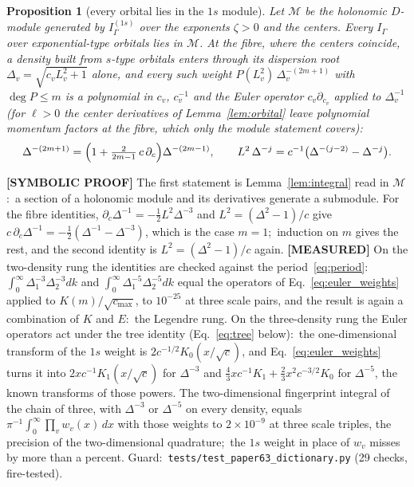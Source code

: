 \documentclass[aps,pra,twocolumn,superscriptaddress,longbibliography]{revtex4-2}
\newtheorem{proposition}{Proposition}
\begin{document}
\begin{proposition}[every orbital lies in the $1s$ module]
\label{prop:rung}
Let $\mathcal{M}$ be the holonomic $D$-module generated by $I^{(1s)}_\Gamma$
over the exponents $\zeta>0$ and the centers.  Every $I_\Gamma$ over
exponential-type orbitals lies in $\mathcal{M}$.  At
the fibre, where the centers coincide, a density built from $s$-type orbitals
enters through its dispersion root $\Delta_v=\sqrt{c_vL_v^2+1}$ alone, and
every such weight $P(L_v^2)\,\Delta_v^{-(2m+1)}$ with $\deg P\le m$ is a
polynomial in $c_v$,
$c_v^{-1}$ and the Euler operator $c_v\partial_{c_v}$ applied to
$\Delta_v^{-1}$ (for $\ell>0$ the center derivatives of
Lemma~\ref{lem:orbital} leave polynomial momentum factors at the fibre, which
only the module statement covers):
%
\begin{equation}
  \Delta^{-(2m+1)}=\Bigl(1+\tfrac{2}{2m-1}\,c\,\partial_c\Bigr)\Delta^{-(2m-1)},
  \qquad
  L^{2}\,\Delta^{-j}=c^{-1}\bigl(\Delta^{-(j-2)}-\Delta^{-j}\bigr).
  \label{eq:euler_weights}
\end{equation}
\end{proposition}

\textbf{[SYMBOLIC PROOF]} The first statement is
Lemma~\ref{lem:integral} read in $\mathcal{M}$:\ a section of a holonomic
module and its derivatives generate a submodule.  For the fibre identities,
$\partial_c\Delta^{-1}=-\tfrac12L^2\Delta^{-3}$ and $L^2=(\Delta^2-1)/c$ give
$c\,\partial_c\Delta^{-1}=-\tfrac12(\Delta^{-1}-\Delta^{-3})$, which is the
case $m=1$;\ induction on $m$ gives the rest, and the second identity is
$L^2=(\Delta^2-1)/c$ again.  \textbf{[MEASURED]} On the two-density rung the
identities are checked against the period~\eqref{eq:period}:\
$\int_0^\infty\Delta_1^{-3}\Delta_2^{-3}dk$ and
$\int_0^\infty\Delta_1^{-5}\Delta_2^{-5}dk$ equal the operators of
Eq.~\eqref{eq:euler_weights} applied to $K(m)/\sqrt{c_{\max}}$, to $10^{-25}$
at three scale pairs, and the result is again a combination of $K$ and $E$:\
the Legendre rung.  On the three-density rung
the Euler operators act under the tree identity (Eq.~\eqref{eq:tree} below):\
the one-dimensional transform of the $1s$ weight is $2c^{-1/2}K_0(x/\sqrt c)$,
and Eq.~\eqref{eq:euler_weights} turns it into $2xc^{-1}K_1(x/\sqrt c)$ for
$\Delta^{-3}$ and $\tfrac43xc^{-1}K_1+\tfrac23x^2c^{-3/2}K_0$ for
$\Delta^{-5}$, the known transforms of those powers.  The two-dimensional
fingerprint integral of the chain of three, with $\Delta^{-3}$ or
$\Delta^{-5}$ on every density, equals $\pi^{-1}\!\int_0^\infty\prod_v w_v(x)\,dx$
with those weights to $2\times10^{-9}$ at three scale triples, the precision of
the two-dimensional quadrature;\ the $1s$ weight in place of $w_v$ misses by
more than a percent.  Guard:\ \texttt{tests/test\_paper63\_dictionary.py}
(29 checks, fire-tested).
\end{document}
